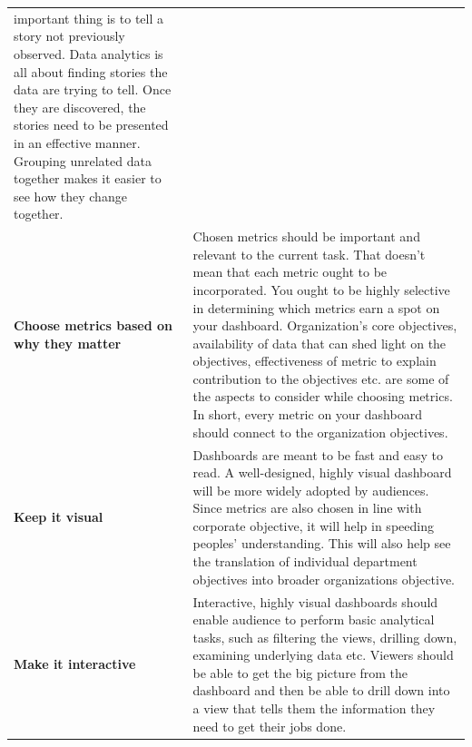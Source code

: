 \documentclass[]{book}
\begin{document}
\begin{longtable}[]{@{}ll@{}}
\begin{minipage}[t]{0.72\columnwidth}
important thing is to tell a story not previously observed. Data
analytics is all about finding stories the data are trying to tell. Once
they are discovered, the stories need to be presented in an effective
manner. Grouping unrelated data together makes it easier to see how they
change together.\strut
\end{minipage}\tabularnewline
\begin{minipage}[t]{0.17\columnwidth}\raggedright\strut
\textbf{Choose metrics based on why they matter}\strut
\end{minipage} & \begin{minipage}[t]{0.72\columnwidth}\raggedright\strut
Chosen metrics should be important and relevant to the current task.
That doesn't mean that each metric ought to be incorporated. You ought
to be highly selective in determining which metrics earn a spot on your
dashboard. Organization's core objectives, availability of data that can
shed light on the objectives, effectiveness of metric to explain
contribution to the objectives etc. are some of the aspects to consider
while choosing metrics. In short, every metric on your dashboard should
connect to the organization objectives.\strut
\end{minipage}\tabularnewline
\begin{minipage}[t]{0.17\columnwidth}\raggedright\strut
\textbf{Keep it visual}\strut
\end{minipage} & \begin{minipage}[t]{0.72\columnwidth}\raggedright\strut
Dashboards are meant to be fast and easy to read. A well-designed,
highly visual dashboard will be more widely adopted by audiences. Since
metrics are also chosen in line with corporate objective, it will help
in speeding peoples' understanding. This will also help see the
translation of individual department objectives into broader
organizations objective.\strut
\end{minipage}\tabularnewline
\begin{minipage}[t]{0.17\columnwidth}\raggedright\strut
\textbf{Make it interactive}\strut
\end{minipage} & \begin{minipage}[t]{0.72\columnwidth}\raggedright\strut
Interactive, highly visual dashboards should enable audience to perform
basic analytical tasks, such as filtering the views, drilling down,
examining underlying data etc. Viewers should be able to get the big
picture from the dashboard and then be able to drill down into a view
that tells them the information they need to get their jobs done.\strut

\end{minipage}
\end{longtable}
\end{document}
